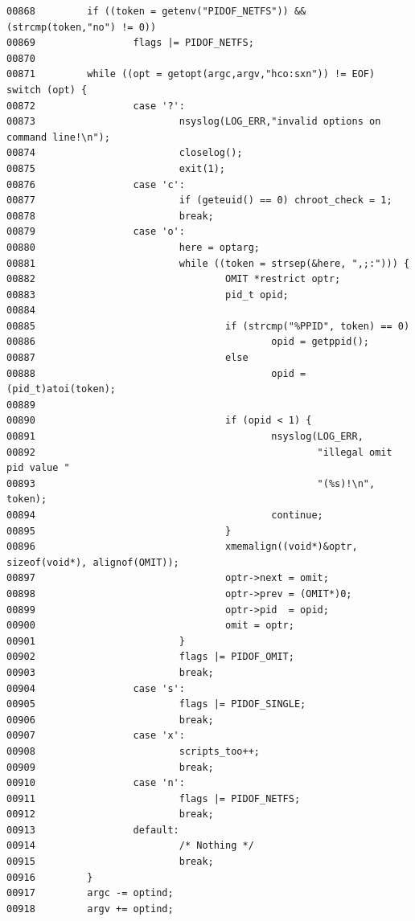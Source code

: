 {\begin{shaded}\begin{verbatim}
00868         if ((token = getenv("PIDOF_NETFS")) && (strcmp(token,"no") != 0))
00869                 flags |= PIDOF_NETFS;
00870 
00871         while ((opt = getopt(argc,argv,"hco:sxn")) != EOF) switch (opt) {
00872                 case '?':
00873                         nsyslog(LOG_ERR,"invalid options on command line!\n");
00874                         closelog();
00875                         exit(1);
00876                 case 'c':
00877                         if (geteuid() == 0) chroot_check = 1;
00878                         break;
00879                 case 'o':
00880                         here = optarg;
00881                         while ((token = strsep(&here, ",;:"))) {
00882                                 OMIT *restrict optr;
00883                                 pid_t opid;
00884 
00885                                 if (strcmp("%PPID", token) == 0)
00886                                         opid = getppid();
00887                                 else
00888                                         opid = (pid_t)atoi(token);
00889 
00890                                 if (opid < 1) {
00891                                         nsyslog(LOG_ERR,
00892                                                 "illegal omit pid value "
00893                                                 "(%s)!\n", token);
00894                                         continue;
00895                                 }
00896                                 xmemalign((void*)&optr, sizeof(void*), alignof(OMIT));
00897                                 optr->next = omit;
00898                                 optr->prev = (OMIT*)0;
00899                                 optr->pid  = opid;
00900                                 omit = optr;
00901                         }
00902                         flags |= PIDOF_OMIT;
00903                         break;
00904                 case 's':
00905                         flags |= PIDOF_SINGLE;
00906                         break;
00907                 case 'x':
00908                         scripts_too++;
00909                         break;
00910                 case 'n':
00911                         flags |= PIDOF_NETFS;
00912                         break;
00913                 default:
00914                         /* Nothing */
00915                         break;
00916         }
00917         argc -= optind;
00918         argv += optind;
\end{verbatim}\end{shaded}}
